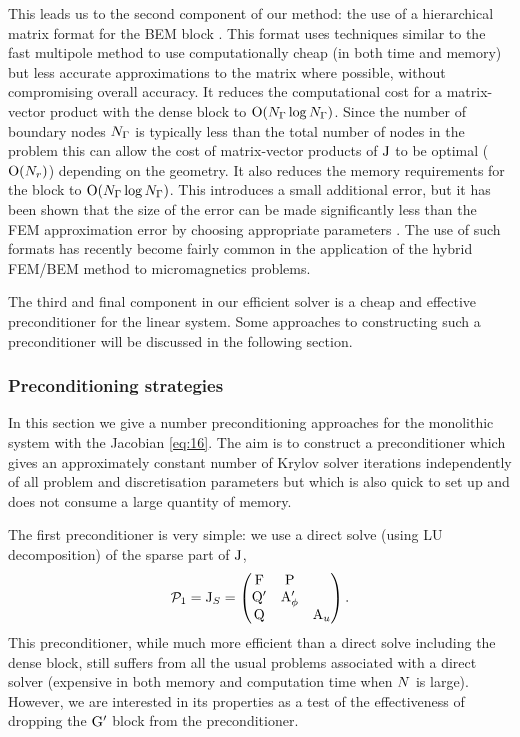 This leads us to the second component of our method: the use of a hierarchical matrix format for the BEM block \cite{Borm2003,Forster2003,Knittel2011}.
This format uses techniques similar to the fast multipole method to use computationally cheap (in both time and memory) but less accurate approximations to the matrix where possible, without compromising overall accuracy.
It reduces the computational cost for a matrix-vector product with the dense block to $\mathrm{O}{\left( N_{\Gamma} \log N_{\Gamma} \right)}$.
Since the number of boundary nodes $N_{\Gamma}$ is typically less than the total number of nodes in the problem this can allow the cost of matrix-vector products of $\mathrm{J}$ to be optimal (\ie $\mathrm{O}{\left( N_r \right)}$) depending on the geometry.
It also reduces the memory requirements for the block to $\mathrm{O}{\left( N_{\Gamma} \log N_{\Gamma} \right)}$.
This introduces a small additional error, but it has been shown that the size of the error can be made significantly less than the FEM approximation error by choosing appropriate parameters \cite[77]{Knittel2011}.
The use of such formats has recently become fairly common in the application of the hybrid FEM/BEM method to micromagnetics problems.

The third and final component in our efficient solver is a cheap and effective preconditioner for the linear system.
Some approaches to constructing such a preconditioner will be discussed in the following section.


\subsubsection{Preconditioning strategies}
\label{sec:bem-solver-strategies}


In this section we give a number preconditioning approaches for the monolithic system with the Jacobian \cref{eq:16}.
The aim is to construct a preconditioner which gives an approximately constant number of Krylov solver iterations independently of all problem and discretisation parameters but which is also quick to set up and does not consume a large quantity of memory.

The first preconditioner is very simple: we use a direct solve (using LU decomposition) of the sparse part of $\mathrm{J}$, \ie
\begin{equation}
  \mathcal{P}_1 = \mathrm{J}_S =
  \begin{pmatrix}
    \mathrm{F}       & \mathrm{P}     &  \\
    \mathrm{Q}'       & \mathrm{A}_\phi'    &   \\
    \mathrm{Q}       &         &   \mathrm{A}_u
  \end{pmatrix}.
\label{eq:90}
\end{equation}
This preconditioner, while much more efficient than a direct solve including the dense block, still suffers from all the usual problems associated with a direct solver (\ie expensive in both memory and computation time when $N$ is large).
However, we are interested in its properties as a test of the effectiveness of dropping the $\mathrm{G}'$ block from the preconditioner.

